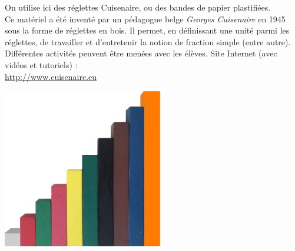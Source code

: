 \begin{exercice*}
   \begin{minipage}{8cm}
      On utilise ici des réglettes Cuisenaire, ou des bandes de papier plastifiées. \\
      Ce matériel a été inventé par un pédagogue belge {\it Georges Cuisenaire} en 1945 sous la forme de réglettes en bois. Il permet, en définissant une unité parmi les réglettes, de travailler et d’entretenir la notion de fraction simple (entre autre). \\
      Différentes activités peuvent être menées avec les élèves. Site Internet (avec vidéos et tutoriels) : \\
      \href{http://www.cuisenaire.eu}{http://www.cuisenaire.eu}
   \end{minipage}
   \qquad
   \begin{minipage}{7cm}
      \includegraphics[width=7cm]{Nombres_et_calculs_did/Images/Num4_activites_Cuisenaire}
   \end{minipage} \\ [2mm]
   
   \bigskip
   

\end{exercice*}
